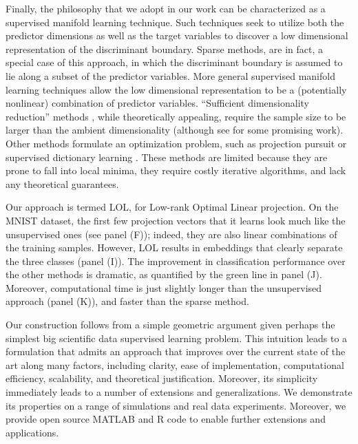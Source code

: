 \documentclass[10pt]{article}
\begin{document}
Finally, the philosophy that we adopt in our work can be characterized as a supervised manifold learning technique. Such techniques seek to utilize both the predictor dimensions as well as the target variables to discover a low dimensional representation of the discriminant boundary.  Sparse methods, are in fact, a special case of this approach, in which the discriminant boundary is assumed to lie along  a subset of the predictor variables.  More general supervised manifold learning techniques allow the low dimensional representation to be a (potentially nonlinear) combination of predictor variables.  ``Sufficient dimensionality reduction'' methods  \cite{Li1991, Cook91a, Globerson2003, Bouveyron07a, Cook08a}, while theoretically appealing, require the sample size to be larger than the ambient dimensionality  (although see \cite{Cook13a} for some promising work).  Other methods formulate an optimization problem, such as projection pursuit \cite{Huber1985} or supervised dictionary learning \cite{Mairal2008}.  These methods are limited because they are prone to fall into local minima, they require costly iterative algorithms, and lack any theoretical guarantees.  

Our approach is termed LOL, for Low-rank Optimal Linear projection.  On the MNIST dataset, the first few projection vectors that it learns look much like the unsupervised ones (see panel (F)); indeed, they are also linear combinations of the training samples. However, LOL results in embeddings that clearly separate the three classes (panel (I)).  The improvement in classification performance over the other methods is dramatic, as quantified by the green line in panel (J).  Moreover, computational time is just slightly longer than the unsupervised approach (panel (K)), and faster than the sparse method.

Our construction follows from a simple geometric argument given perhaps the simplest big scientific data supervised learning problem.  This intuition leads to a formulation that admits an approach that improves over the current state of the art along many factors, including clarity, ease of implementation, computational efficiency, scalability, and theoretical justification.  Moreover, its simplicity immediately leads to a number of extensions and generalizations.  We demonstrate its properties on a range of simulations and real data experiments.  Moreover, we provide open source MATLAB and R code to enable further extensions and applications.
\end{document}
